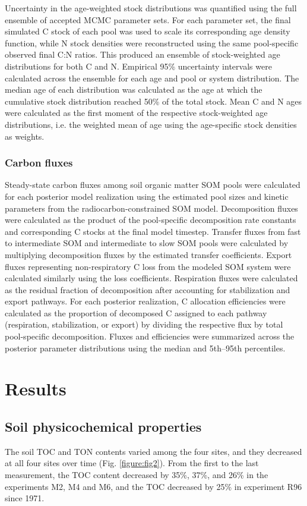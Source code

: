 \documentclass[bg, manuscript]{copernicus}
\begin{document}
Uncertainty in the age-weighted stock distributions was quantified using the full ensemble of accepted MCMC parameter sets. For each parameter set, the final simulated C stock of each pool was used to scale its corresponding age density function, while N stock densities were reconstructed using the same pool-specific observed final C:N ratios. This produced an ensemble of stock-weighted age distributions for both C and N. Empirical 95\% uncertainty intervals were calculated across the ensemble for each age and pool or system distribution.
The median age of each distribution was calculated as the age at which the cumulative stock distribution reached 50\% of the total stock. Mean C and N ages were calculated as the first moment of the respective stock-weighted age distributions, i.e. the weighted mean of age using the age-specific stock densities as weights.

\subsubsection{Carbon fluxes}
Steady-state carbon fluxes among soil organic matter SOM pools were calculated for each posterior model realization using the estimated pool sizes and kinetic parameters from the radiocarbon-constrained SOM model. Decomposition fluxes were calculated as the product of the pool-specific decomposition rate constants and corresponding C stocks at the final model timestep. Transfer fluxes from fast to intermediate SOM and intermediate to slow SOM pools were calculated by multiplying decomposition fluxes by the estimated transfer coefficients. Export fluxes representing non-respiratory C loss from the modeled SOM system were calculated similarly using the loss coefficients. Respiration fluxes were calculated as the residual fraction of decomposition after accounting for stabilization and export pathways. For each posterior realization, C allocation efficiencies were calculated as the proportion of decomposed C assigned to each pathway (respiration, stabilization, or export) by dividing the respective flux by total pool-specific decomposition. Fluxes and efficiencies were summarized across the posterior parameter distributions using the median and 5th--95th percentiles.

\section{Results}

\subsection{Soil physicochemical properties}
The soil TOC and TON contents varied among the four sites, and they decreased at all four sites over time (Fig. \ref{figure:fig2}). From the first to the last measurement, the TOC content decreased by 35\%, 37\%, and 26\% in the experiments M2, M4 and M6, and the TOC decreased by 25\% in experiment R96 since 1971.
\end{document}
